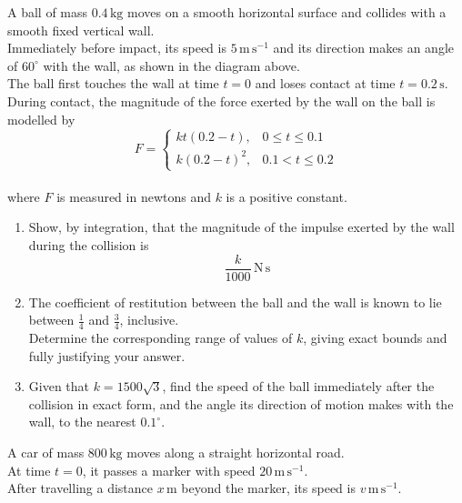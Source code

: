 \documentclass[leqno]{article}
\begin{document}
\begin{enumerate}[
  label=\textbf{\arabic*.},
  leftmargin=*,
  topsep=0pt,
  partopsep=0pt,
  parsep=0pt
]
A ball of mass $0.4\,\mathrm{kg}$ moves on a smooth horizontal surface and collides with a smooth fixed vertical wall. \\
Immediately before impact, its speed is $5\,\mathrm{m\,s^{-1}}$ and its direction makes an angle of $60^\circ$ with the wall, as shown in the diagram above. \\

The ball first touches the wall at time $t=0$ and loses contact at time $t=0.2\,\mathrm{s}$. \\
During contact, the magnitude of the force exerted by the wall on the ball is modelled by
\[
F=\begin{cases}
kt(0.2-t), & 0\leq t\leq 0.1\\
k(0.2-t)^2, & 0.1<t\leq 0.2
\end{cases}
\] \\
where $F$ is measured in newtons and $k$ is a positive constant. \\
\begin{enumerate}[label=\textbf{(\alph*)}]
\item Show, by integration, that the magnitude of the impulse exerted by the wall during the collision is
\[
\frac{k}{1000}\,\mathrm{N\,s}
\] 
\item The coefficient of restitution between the ball and the wall is known to lie between $\frac{1}{4}$ and $\frac{3}{4}$, inclusive. \\
Determine the corresponding range of values of $k$, giving exact bounds and fully justifying your answer.  \\
\item Given that $k=1500\sqrt{3}$, find the speed of the ball immediately after the collision in exact form, and the angle its direction of motion makes with the wall, to the nearest $0.1^\circ$.  \\
\end{enumerate}

\newpage

\questionitem

A car of mass $800\,\mathrm{kg}$ moves along a straight horizontal road. \\
At time $t=0$, it passes a marker with speed $20\,\mathrm{m\,s^{-1}}$. \\
After travelling a distance $x\,\mathrm{m}$ beyond the marker, its speed is $v\,\mathrm{m\,s^{-1}}$. \\


\end{enumerate}
\end{document}
